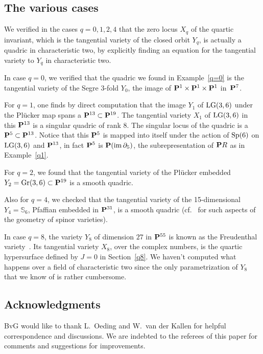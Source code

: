 \documentclass[pdftex]{sigma}
\newcommand{\PP}{{\bf P}}
\newcommand{\bS}{{\mathbb S}}
\newcommand{\im}{\operatorname{im}}
\numberwithin{equation}{section}
\begin{document}
\subsection{The various cases} \label{varcas}
We verified in the cases $q=0,1,2,4$ that the zero locus $X_q$ of the quartic invariant, which is the tangential variety of the closed orbit $Y_q$, is actually a quadric in characteristic two, by explicitly finding an equation for the tangential variety to $Y_q$ in characteristic two.

In case $q=0$, we verified that the quadric we found in Example~\ref{q=0} is the tangential variety of the Segre 3-fold $Y_0$, the image of $\PP^1\times\PP^1\times\PP^1$ in~$\PP^7$.

For $q=1$, one finds by direct computation that the image $Y_1$ of ${\rm LG}(3,6)$ under the Pl\"ucker map spans a $\PP^{13}\subset\PP^{19}$. The tangential variety $X_1$ of ${\rm LG}(3,6)$ in this $\PP^{13}$ is a singular quadric of rank $8$. The singular locus of the quadric is a $\PP^5\subset\PP^{13}$. Notice that this $\PP^5$ is mapped into itself under the action of ${\rm Sp}(6)$ on ${\rm LG}(3,6)$ and $\PP^{13}$, in fact $\PP^5$ is $\PP(\im\partial_5)$, the subrepresentation of $\PP R$ as in Example~\ref{q1}.

For $q=2$, we found that the tangential variety of the Pl\"ucker embedded $Y_2={\rm Gr}(3,6)\subset\PP^{19}$ is a smooth quadric.

Also for $q=4$, we checked that the tangential variety of the 15-dimensional $Y_4=\bS_6$, Pfaffian embedded in $\PP^{31}$, is a smooth quadric (cf.~\cite{M} for such aspects of the geometry of spinor varieties).

In case $q=8$, the variety $Y_8$ of dimension $27$ in $\PP^{55}$ is known as the Freudenthal variety~\cite{MM}. Its tangential variety $X_8$, over the complex numbers, is the quartic hypersurface defined by $J=0$ in Section~\ref{q8}. We haven't computed what happens over a field of characteristic two since the only parametrization of $Y_8$ that we know of is rather cumbersome.

\subsection*{Acknowledgments}
BvG would like to thank L.~Oeding and W.~van der Kallen for helpful correspondence and discussions. We are indebted to the referees of this paper for comments and suggestions
for improvements.
\end{document}

